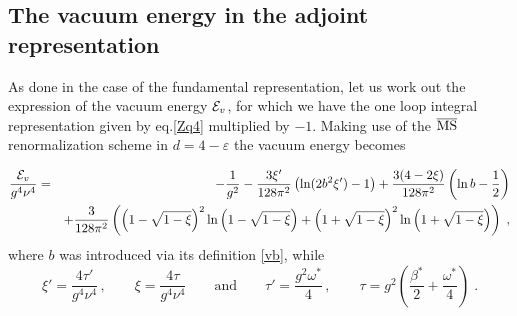 \subsection{The vacuum energy in the adjoint representation}
As done in the case of the fundamental representation, let us work out the expression of the vacuum energy ${\cal E}_v$, for which we have the one loop  integral representation given by eq.\eqref{Zq4} multiplied by $-1$.
Making use of the $\overline{\mbox{MS}}$ renormalization scheme in $d = 4 - \varepsilon$ the vacuum energy becomes

\begin{eqnarray}\label{ddvac4}
\frac{{\cal E}_v}{g^4\nu^4}&=& -\frac{1}{g^2}-\frac{3\xi'}{128\pi^2}\left(\ln(2b^2\xi')-1\right)+\frac{3(4-2\xi)}{128\pi^2}\left(\ln b-\frac{1}{2}\right)\nonumber\\
&&+\frac{3}{128\pi^2}\left(\left(1-\sqrt{1-\xi}\right)^2\ln\left(1-\sqrt{1-\xi}\right)+\left(1+\sqrt{1-\xi}\right)^2\ln\left(1+\sqrt{1-\xi}\right)\right)\;,
\end{eqnarray}
where $b$ was introduced via its definition \eqref{vb}, while
\begin{equation}\label{ddvac5}
    \xi'=\frac{4\tau'}{g^4\nu^4}\,,\qquad \xi=\frac{4\tau}{g^4\nu^4} 
\qquad \text{and} \qquad 
\tau'=\frac{g^2\omega^*}{4}\,,\qquad \tau=g^2\left(\frac{\beta^*}{2}+\frac{\omega^*}{4}\right)    \;.
\end{equation}

